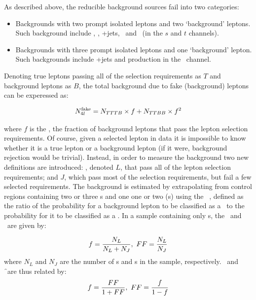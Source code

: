 As described above, the reducible background sources fail into two categories:

\begin{itemize}
\item Backgrounds with two prompt isolated leptons and two `background' leptons. Such
background include \Zjets, \Zgamma, \WW+jets, \ttbar\ and \singletop\ (in the
$s$ and $t$ channels).
\item Backgrounds with three prompt isolated leptons and one `background'
lepton. Such backgrounds include \WZ+jets and \singletop production in the \Wt\
channel.
\end{itemize}

Denoting true leptons passing all of the selection requirements as $T$ and background leptons as $B$, the total background due
to fake (background) leptons can be experessed as:

\begin{equation}
N_{4l}^{\rm fake} = N_{TTTB} \times f + N_{TTBB} \times f^{2}
\label{eqn:bg-4l-true}
\end{equation}

where $f$ is the \frate, the fraction of background leptons that pass the lepton selection
requirements. Of course, given a selected lepton in data it is impossible to
know whether it is a true lepton or a background lepton (if it were, background
rejection would be trivial). Instead, in order to measure the background 
two new definitions are introduced: \intro{selected leptons}, denoted $L$, that
pass all of the lepton selection requirements; and \intro{lepton-like-jets} $J$, which
pass most of the selection requirements, but fail a few selected requirements.
The background is estimated by extrapolating from control regions containing
two or three \sellep s and one one or two \lljet (s) using the
\intro{\ffactor}\ \FF, defined as the ratio of the probability for a background lepton to be
classified as a \sellep\ to the probability for it to be classified as a \lljet.
In a sample containing only \bglep s, the \frate\ and \ffactor\ are given by: 

\begin{equation}
f = \frac{N_{L}}{N_{L} + N_{J}},\ FF = \frac{N_{L}}{N_{J}}
\end{equation}
where $N_{L}$ and $N_{J}$ are the number of \sellep s and \lljet s in the sample,
respectively. \FF\ and \f\ are thus related by:
\begin{equation}
f = \frac{FF}{1 + FF},\ FF = \frac{f}{1-f}
\label{eqn:bg-f-FF-relations}
\end{equation}

